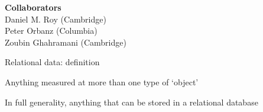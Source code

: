 \small
\renewcommand{\inserttotalframenumber}{11}

%

\begin{frame}
  \begin{block}{}
    \titlepage
  \end{block}
  \begin{center}
    {\bf  Collaborators}\\
    Daniel M. Roy (Cambridge)\\
    Peter Orbanz (Columbia)\\
    Zoubin Ghahramani (Cambridge)
  \end{center}
\end{frame}

\begin{frame}{Relational data: definition}
  \begin{block}{}
    Anything measured at more than one type of `object'
  \end{block}
  \begin{block}{}
  	\center
	\vspace{-1\baselineskip}
    
  \end{block}
  \begin{block}{}
    In full generality, anything that can be stored in a relational database
  \end{block}
\end{frame}

